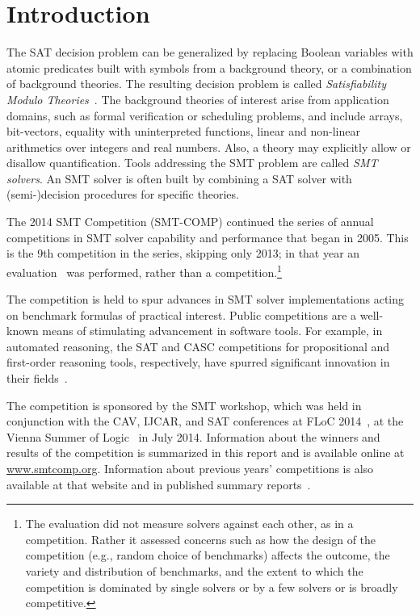 \documentclass[twoside,11pt]{article}
\begin{document}
\section{Introduction}
\label{sec:intro}

The SAT decision problem can be generalized by replacing
Boolean variables with atomic predicates built with symbols from a
background theory, or a combination of background theories. The
resulting decision problem is called \emph{Satisfiability Modulo
  Theories}~\cite{DBLP:conf/jelia/Tinelli02}. The background theories of interest arise from
	application domains, such as formal verification or scheduling problems, and include arrays,
bit-vectors, equality with uninterpreted functions, linear and
non-linear arithmetics over integers and real numbers. Also, a theory
may explicitly allow or disallow quantification. Tools addressing the
SMT problem are called \emph{SMT solvers\/}. An SMT solver is often
built by combining a SAT solver with (semi-)decision procedures for
specific theories.

The 2014 SMT Competition (SMT-COMP) continued the series of annual competitions in SMT solver capability and performance that began in 2005. This is the 9th competition in the series, skipping only 2013; in that year an evaluation~\cite{it:2014-017} was performed, rather than a competition.\footnote{The evaluation did not measure solvers against each other, as in a competition. Rather it assessed concerns such as how the design of the competition (e.g., random choice of benchmarks) affects the outcome, the variety and distribution of benchmarks, and the extent to which the competition is dominated by single solvers or by a few solvers or is broadly competitive.}

The competition is held to spur advances in
SMT solver implementations acting on benchmark formulas of practical interest. Public competitions are
a well-known means of stimulating advancement in software tools. For example, in automated
reasoning, the SAT and CASC competitions for propositional and first-order reasoning tools, respectively,
have spurred significant innovation in their fields~\cite{satwebsite,jarvisalo2012international,leberre+03,PSS02}.

The competition is sponsored by the SMT workshop, which was held in conjunction with the
CAV, IJCAR, and SAT conferences at FLoC 2014~\cite{FLoC2014}, at the Vienna Summer of Logic~\cite{VSL} in July 2014.
Information about the winners
and results of the competition is summarized in this report and is available online at \url{www.smtcomp.org}.  Information
about previous years' competitions is also available at that website and in published summary reports~\cite{springerlink:10.1007/s10817-012-9246-5,DBLP:conf/cade/CokGBD12,it:2014-017}.
\end{document}
